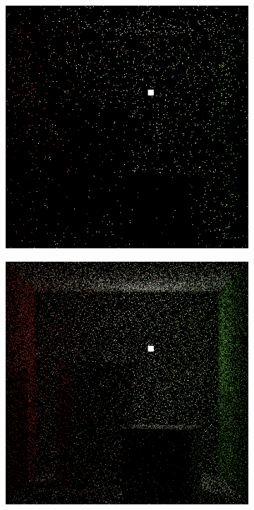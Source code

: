 \begin{figure}[]
    \centering
    \begin{subfigure}[b]{0.32\textwidth}
        \centering
        \includegraphics[width=\textwidth]{images/03-sampling_path.jpg}
        \caption{}
        \label{fig:methods_sampling_path}
    \end{subfigure}
    \hfill
    \begin{subfigure}[b]{0.32\textwidth}
        \centering
        \includegraphics[width=\textwidth]{images/03-sampling_bdpt.jpg}

\end{subfigure}
\end{figure}
